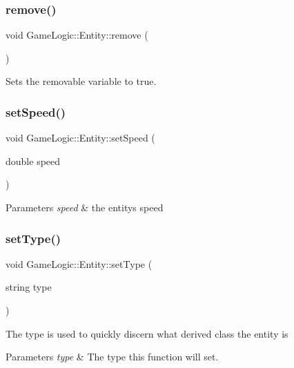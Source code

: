 \subsubsection{\texorpdfstring{remove()}{remove()}}
{\footnotesize\ttfamily void Game\+Logic\+::\+Entity\+::remove (\begin{DoxyParamCaption}{ }\end{DoxyParamCaption})}

Sets the removable variable to true. \mbox{\label{classGameLogic_1_1Entity_ae0f16e2b996a2654851e757dfa255ba9}} 
\subsubsection{\texorpdfstring{set\+Speed()}{setSpeed()}}
{\footnotesize\ttfamily void Game\+Logic\+::\+Entity\+::set\+Speed (\begin{DoxyParamCaption}\item[{double}]{speed }\end{DoxyParamCaption})}


\begin{DoxyParams}{Parameters}
{\em speed} & the entity\textquotesingle{}s speed \\
\hline
\end{DoxyParams}
\mbox{\label{classGameLogic_1_1Entity_a5333b148dd17e31aafd6e115e0b3b43d}} 
\subsubsection{\texorpdfstring{set\+Type()}{setType()}}
{\footnotesize\ttfamily void Game\+Logic\+::\+Entity\+::set\+Type (\begin{DoxyParamCaption}\item[{string}]{type }\end{DoxyParamCaption})\hspace{0.3cm}{\ttfamily [protected]}}

The type is used to quickly discern what derived class the entity is 
\begin{DoxyParams}{Parameters}
{\em type} & The type this function will set. \\
\hline
\end{DoxyParams}
\mbox{\label{classGameLogic_1_1Entity_a570383f8bb12fc3185d136289f2149c8}} 
